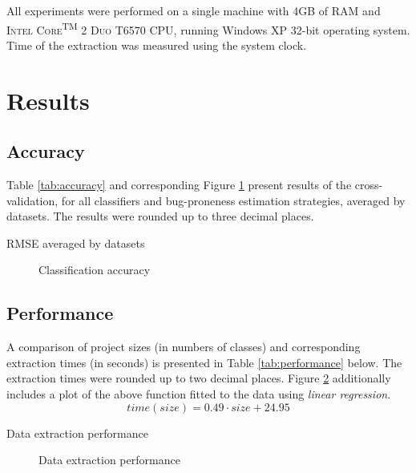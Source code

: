 \documentclass{pracamgr}
\begin{document}
All experiments were performed on a single machine with 4GB of RAM and \textsc{Intel}\textsuperscript{\textregistered} \textsc{Core}\textsuperscript{TM} 2 \textsc{Duo} T6570 CPU, running Windows XP 32-bit operating system. Time of the extraction was measured using the system clock.

\section{Results}
\label{sec:results}

\subsection{Accuracy}
\label{sec:accuracy}

Table \ref{tab:accuracy} and corresponding Figure \ref{fig:accuracy} present results of the cross-validation, for all classifiers and bug-proneness estimation strategies, averaged by datasets. The results were rounded up to three decimal places.

\begin{table}[h]
\caption{RMSE averaged by datasets}
\label{tab:accuracy}

\end{table}


\begin{figure}[h]
\centering

\caption{Classification accuracy}
\label{fig:accuracy}
\end{figure}

\subsection{Performance}
\label{sec:performance}

A comparison of project sizes (in numbers of classes) and corresponding extraction times (in seconds) is presented in Table \ref{tab:performance} below. The extraction times were rounded up to two decimal places. Figure \ref{fig:performance} additionally includes a plot of the above function fitted to the data using \emph{linear regression}.
\[
time(size) = 0.49 \cdot size + 24.95
\]

\begin{table}[H]
\caption{Data extraction performance}
\label{tab:performance}
\centering

\end{table}

\begin{figure}[H]
\centering

\caption{Data extraction performance}
\label{fig:performance}
\end{figure}
\end{document}

